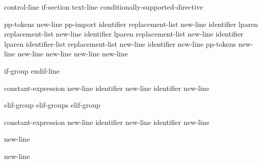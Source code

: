 \begin{bnf}
\br
    control-line\br
    if-section\br
    text-line\br
    \terminal{\#} conditionally-supported-directive
\end{bnf}

\begin{bnf}\obeyspaces
{}\br
     pp-tokens new-line\br
    pp-import\br
     identifier replacement-list new-line\br
     identifier lparen  \terminal{)} replacement-list new-line\br
     identifier lparen  replacement-list new-line\br
     identifier lparen identifier-list  replacement-list new-line\br
     identifier new-line\br
     pp-tokens new-line\br
      new-line\br
      new-line\br
      new-line\br
    \terminal{\# }new-line
\end{bnf}

\begin{bnf}
\br
    if-group   endif-line
\end{bnf}

\begin{bnf}\obeyspaces
{}\br
     constant-expression new-line \br
     identifier new-line \br
     identifier new-line 
\end{bnf}

\begin{bnf}
\br
    elif-group\br
    elif-groups elif-group
\end{bnf}

\begin{bnf}\obeyspaces
{}\br
     constant-expression new-line \br
     identifier new-line \br
     identifier new-line 
\end{bnf}

\begin{bnf}\obeyspaces
{}\br
     new-line 
\end{bnf}

\begin{bnf}\obeyspaces
{}\br
     new-line
\end{bnf}

